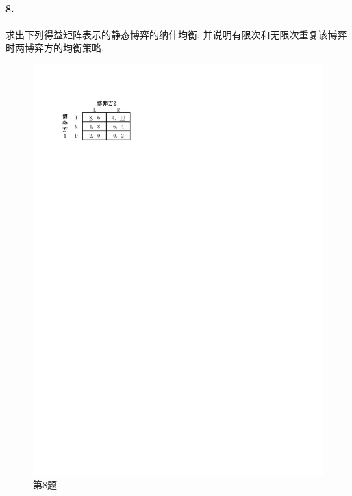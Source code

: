 \documentclass[12pt, a4paper, oneside]{ctexart}
\begin{document}
\paragraph{8.}求出下列得益矩阵表示的静态博弈的纳什均衡, 并说明有限次和无限次重复该博弈时两博弈方的均衡策略.
\begin{figure}[htbp]
    \centering
    \includegraphics[scale=1]{Economic4.8.pdf}
    \caption{第8题}
\end{figure}
\end{document}
